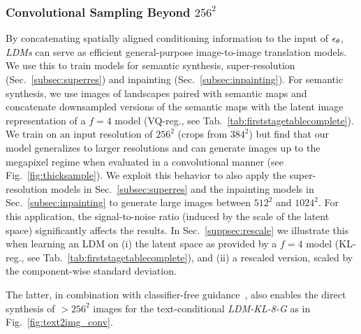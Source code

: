 \documentclass[10pt,twocolumn,letterpaper]{article}
\begin{document}
%
\vspace{-1.0em}
\subsubsection{Convolutional Sampling Beyond $256^2$}
\label{subsubsec:beyond}
%
\vspace{-0.75em}
%
By concatenating spatially aligned conditioning information to the input of
$\epsilon_\theta$, \emph{LDMs} can serve
as efficient general-purpose image-to-image translation models.
We use this to train models for semantic synthesis, super-resolution (Sec.~\ref{subsec:superres}) and inpainting (Sec.~\ref{subsec:inpainting}).
%
For semantic synthesis, we use images of landscapes paired with semantic maps \cite{spade, DBLP:journals/corr/abs-2012-09841}
and concatenate downsampled versions of the semantic maps with the latent image
representation of a $f=4$ model (VQ-reg., see Tab.~\ref{tab:firststagetablecomplete}).
We train on an input resolution of $256^2$ (crops from $384^2$) but find that our model generalizes to larger resolutions
%
and can
generate images up to the megapixel regime when evaluated in a convolutional
manner (see Fig.~\ref{fig:thicksample}).
%
We exploit this behavior to also apply the super-resolution models in
Sec.~\ref{subsec:superres} and the inpainting models in
Sec.~\ref{subsec:inpainting} to generate large images between $512^2$ and $1024^2$.
%
For this application, the signal-to-noise ratio (induced by the scale of the latent space)
significantly affects the results.
In Sec.~\ref{suppsec:rescale} we illustrate this
%
when learning an LDM on (i) the latent space as provided by a $f=4$ model (KL-reg., see Tab.~\ref{tab:firststagetablecomplete}),
and (ii) a rescaled version, scaled by the component-wise standard deviation. 

The latter, in combination with classifier-free guidance~\cite{ho2021classifier}, also enables the direct synthesis of 
$>256^2$ images for the text-conditional \emph{LDM-KL-8-G} as in Fig.~\ref{fig:text2img_conv}.

%
\thicksample
%
%
\vspace{-0.5em}
\end{document}
